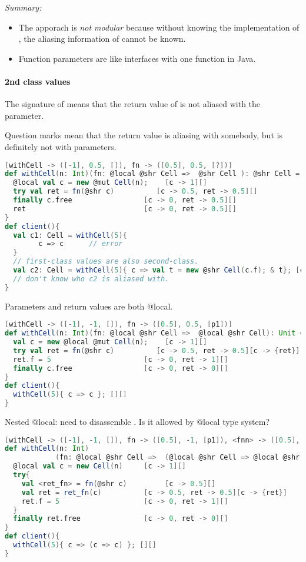 \emph{Summary:} 
\begin{itemize}
\item The apporach is \emph{not modular} because without knowing the implementation of , the aliasing information of  cannot be known.
\item Function parameters are like interfaces with one function in Java.
\end{itemize}


\paragraph{2nd class values} 

The signature of  means that the return value of  is not aliased with the parameter. 

Question marks mean that the return value is aliasing with somebody, but is definitely not with parameters.
\begin{lstlisting}[language=Scala,basicstyle=\footnotesize\ttfamily]
[withCell -> ([-1], 0.5, []), fn -> ([0.5], 0.5, [?])]
def withCell(n: Int)(fn: @local @shr Cell =>  @shr Cell ): @shr Cell = {
  @local val c = new @mut Cell(n);    [c -> 1][]
  try val ret = fn(@shr c)          [c -> 0.5, ret -> 0.5][]  
  finally c.free                 [c -> 0, ret -> 0.5][]  
  ret                            [c -> 0, ret -> 0.5][]     
}
def client(){
  val c1: Cell = withCell(5){ 
        c => c      // error
  }
  // first-class values are also second-class.
  val c2: Cell = withCell(5){ c => val t = new @shr Cell(c.f); & t}; [c2 -> 0.5][] //unsafe
  // don't know who c2 is aliased with.
}
\end{lstlisting}


Parameters and return values are both @local.
\begin{lstlisting}[language=Scala,basicstyle=\footnotesize\ttfamily]
[withCell -> ([-1], -1, []), fn -> ([0.5], 0.5, [p1])]
def withCell(n: Int)(fn: @local @shr Cell =>  @local @shr Cell): Unit = {
  val c = new @local @mut Cell(n);    [c -> 1][]
  try val ret = fn(@shr c)          [c -> 0.5, ret -> 0.5][c -> {ret}]
  ret.f = 5                      [c -> 0, ret -> 1][]
  finally c.free                 [c -> 0, ret -> 0][]  
}
def client(){
  withCell(5){ c => c }; [][]
}
\end{lstlisting}

Nested @local: need to disassemble . Is it allowed by @local type system?
\begin{lstlisting}[language=Scala,basicstyle=\footnotesize\ttfamily]
[withCell -> ([-1], -1, []), fn -> ([0.5], -1, [p1]), <fnn> -> ([0.5], 0.5, [p1])]
def withCell(n: Int)
            (fn: @local @shr Cell =>  (@local @shr Cell => @local @shr Cell)): Unit = {
  @local val c = new Cell(n)     [c -> 1][]
  try{ 
    val <ret_fn> = fn(@shr c)         [c -> 0.5][]  
    val ret = ret_fn(c)          [c -> 0.5, ret -> 0.5][c -> {ret}]  
    ret.f = 5                    [c -> 0, ret -> 1][]
  }
  finally ret.free               [c -> 0, ret -> 0][]  
}
def client(){
  withCell(5){ c => (c => c) }; [][]
}
\end{lstlisting}

